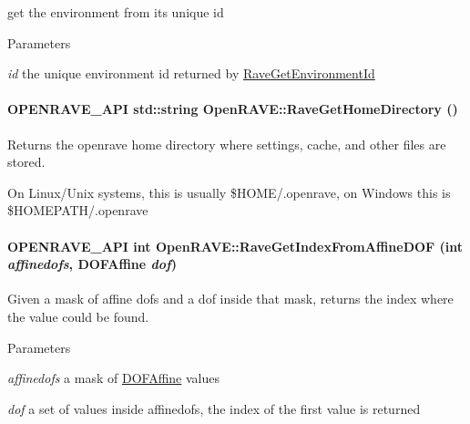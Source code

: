get the environment from its unique id 


\begin{DoxyParams}{Parameters}
\item[{\em id}]the unique environment id returned by \hyperlink{namespaceOpenRAVE_aab71f332a1a87d00dbfaea9404034855}{RaveGetEnvironmentId} \end{DoxyParams}
\hypertarget{namespaceOpenRAVE_a55e1d8c68b801cd293ec78b8d417b7e6}{
\paragraph[{RaveGetHomeDirectory}]{\setlength{\rightskip}{0pt plus 5cm}OPENRAVE\_\-API std::string OpenRAVE::RaveGetHomeDirectory ()}\hfill}
\label{namespaceOpenRAVE_a55e1d8c68b801cd293ec78b8d417b7e6}


Returns the openrave home directory where settings, cache, and other files are stored. 

On Linux/Unix systems, this is usually \$HOME/.openrave, on Windows this is \$HOMEPATH/.openrave \hypertarget{namespaceOpenRAVE_a5d7ef493cc8ed7bf8a4602cda1468466}{
\paragraph[{RaveGetIndexFromAffineDOF}]{\setlength{\rightskip}{0pt plus 5cm}OPENRAVE\_\-API int OpenRAVE::RaveGetIndexFromAffineDOF (int {\em affinedofs}, \/  DOFAffine {\em dof})}\hfill}
\label{namespaceOpenRAVE_a5d7ef493cc8ed7bf8a4602cda1468466}


Given a mask of affine dofs and a dof inside that mask, returns the index where the value could be found. 


\begin{DoxyParams}{Parameters}
\item[{\em affinedofs}]a mask of \hyperlink{namespaceOpenRAVE_a3016e2185103f3c1bdc5e4482893ca98}{DOFAffine} values \item[{\em dof}]a set of values inside affinedofs, the index of the first value is returned \end{DoxyParams}

